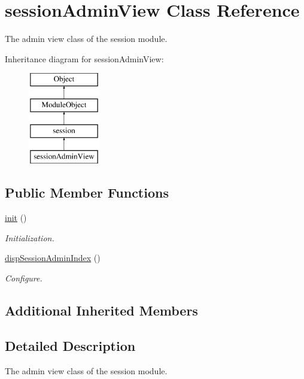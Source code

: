 \hypertarget{classsessionAdminView}{}\section{session\+Admin\+View Class Reference}
\label{classsessionAdminView}


The admin view class of the session module.  


Inheritance diagram for session\+Admin\+View\+:\begin{figure}[H]
\begin{center}
\leavevmode
\includegraphics[height=4.000000cm]{classsessionAdminView}
\end{center}
\end{figure}
\subsection*{Public Member Functions}
\begin{DoxyCompactItemize}
\item 
\hyperlink{classsessionAdminView_af890ef145e5fa8e0d092ab204ef104d6}{init} ()
\begin{DoxyCompactList}\small\item\em Initialization. \end{DoxyCompactList}\item 
\hyperlink{classsessionAdminView_af76bbb38a12a68e4ab36fa67c0b1fe06}{disp\+Session\+Admin\+Index} ()
\begin{DoxyCompactList}\small\item\em Configure. \end{DoxyCompactList}\end{DoxyCompactItemize}
\subsection*{Additional Inherited Members}


\subsection{Detailed Description}
The admin view class of the session module. 

